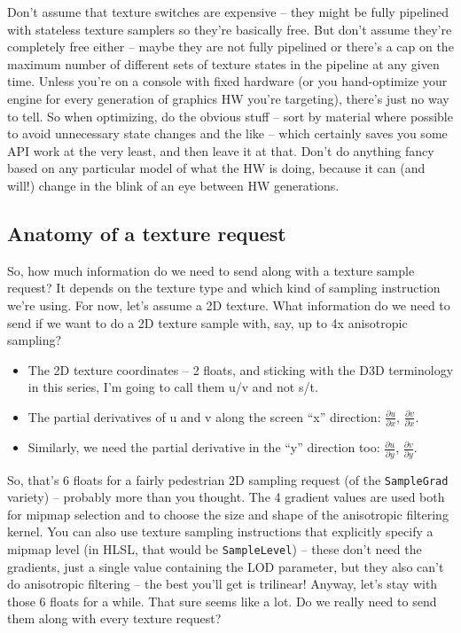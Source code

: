 \documentclass[12pt]{article}
\begin{document}
Don’t assume that texture switches are expensive – they might be fully pipelined with stateless texture samplers so they’re basically free. But don’t assume they’re completely free either – maybe they are not fully pipelined or there’s a cap on the maximum number of different sets of texture states in the pipeline at any given time. Unless you’re on a console with fixed hardware (or you hand-optimize your engine for every generation of graphics HW you’re targeting), there’s just no way to tell. So when optimizing, do the obvious stuff – sort by material where possible to avoid unnecessary state changes and the like – which certainly saves you some API work at the very least, and then leave it at that. Don’t do anything fancy based on any particular model of what the HW is doing, because it can (and will!) change in the blink of an eye between HW generations.

\subsection{Anatomy of a texture request}
\label{sec:orga2c6d77}

So, how much information do we need to send along with a texture sample request? It depends on the texture type and which kind of sampling instruction we’re using. For now, let’s assume a 2D texture. What information do we need to send if we want to do a 2D texture sample with, say, up to 4x anisotropic sampling?

\begin{itemize}
\item The 2D texture coordinates – 2 floats, and sticking with the D3D terminology in this series, I’m going to call them u/v and not s/t.
\item The partial derivatives of u and v along the screen “x” direction: \(\frac{\partial u}{\partial x}\), \(\frac{\partial v}{\partial x}\).
\item Similarly, we need the partial derivative in the “y” direction too: \(\frac{\partial u}{\partial y}\), \(\frac{\partial v}{\partial y}\).
\end{itemize}

So, that’s 6 floats for a fairly pedestrian 2D sampling request (of the \texttt{SampleGrad} variety) – probably more than you thought. The 4 gradient values are used both for mipmap selection and to choose the size and shape of the anisotropic filtering kernel. You can also use texture sampling instructions that explicitly specify a mipmap level (in HLSL, that would be \texttt{SampleLevel}) – these don’t need the gradients, just a single value containing the LOD parameter, but they also can’t do anisotropic filtering – the best you’ll get is trilinear! Anyway, let’s stay with those 6 floats for a while. That sure seems like a lot. Do we really need to send them along with every texture request?
\end{document}
